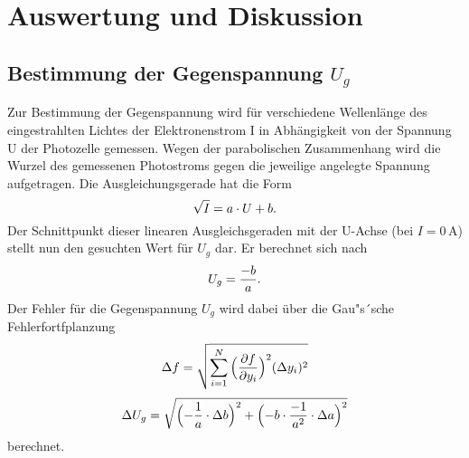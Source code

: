 \section{Auswertung und Diskussion}
\label{sec:Auswertung und Diskussion}
\subsection{Bestimmung der Gegenspannung $U_g$}
Zur Bestimmung der Gegenspannung  wird  für verschiedene Wellenlänge des eingestrahlten Lichtes der
Elektronenstrom I in Abhängigkeit von der Spannung U der Photozelle gemessen.
Wegen der parabolischen Zusammenhang wird die Wurzel des gemessenen Photostroms
gegen die jeweilige angelegte Spannung aufgetragen.
Die Ausgleichungsgerade hat die Form
\begin{equation}
  \sqrt{I}= a\cdot U+b.\\
\end{equation}
Der Schnittpunkt dieser linearen Ausgleichsgeraden mit der U-Achse (bei $I=0\, \text{A}$) stellt nun den gesuchten Wert
für $U_g$ dar. Er berechnet sich nach
\begin{equation}
U_g= \frac{-b}{a}.\\
\end{equation}
Der Fehler für die Gegenspannung $U_g$  wird dabei über die Gau"s´sche Fehlerfortfplanzung 
  \begin{equation}
    \nonumber
      \Delta f = \sqrt{\sum_{i=1}^N {\Bigl(\frac{\partial f}{\partial y_i}\Bigr)^2 (\Delta y_i)^2}}\\
  \end{equation}
  \begin{align*}
   \Delta U_g =\sqrt{\Bigl(- \frac{1}{a} \cdot \Delta b \Bigr)^2+\Bigl(-b\cdot \frac{-1}{a^2} \cdot \Delta a\Bigr)^2}\\
  \end{align*}
  berechnet.

